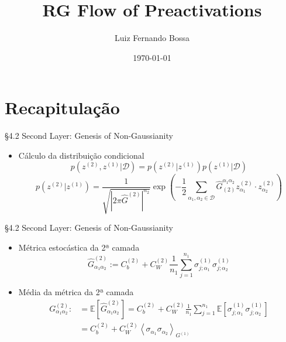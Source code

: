\documentclass{beamer}
\title{RG Flow of Preactivations}
\author{Luiz Fernando Bossa}
\date{\today}
\institute{Universidade Federal de Santa Catarina}
\newcommand{\EE}{\mathbb{E}}
\def\mi#1{{\alpha_{#1}}}
\def\Gchapp#1{\widehat{G}^{(#1)}}
\newcommand{\Gchapeu}[3]{{\Gchapp{#1}_{\mi{#2}\mi{#3}}}}
\newcommand{\Gchapeuinv}[3]{\widehat{G}_{(#1)}^{\mi{#2}\mi{#3}}}
\newcommand{\Gnormal}[3]{{G^{(#1)}_{\mi{#2}\mi{#3}}}}
\newcommand{\Expectation}[2]{\left\langle #1 \right\rangle_{#2}}
\begin{document}
{ 
\frame{\titlepage}}
\frame{\tableofcontents}


\section{Recapitulação}    
\begin{frame}
\tableofcontents[currentsection]
\end{frame}


\begin{frame}{\S 4.2 Second Layer: Genesis of Non-Gaussianity}
	\begin{itemize}
		\item Cálculo da distribuição condicional
		\begin{equation*}\tag{4.32}
			p\left(z^{(2)},z^{(1)}\Big|\mathcal{D}\right) = p\left(z^{(2)}\Big| z^{(1)}\right)p\left(z^{(1)}\Big| \mathcal{D}\right)
		\end{equation*}
		\begin{equation*}\tag{4.35}
			p\left(z^{(2)}\Big| z^{(1)}\right) = \frac{1}{\sqrt{\left|2\pi \hat{G}^{(2)}\right|^{n_2}}}
			\exp\left(-\frac{1}{2} \sum_{\mi1,\mi2\in\mathcal{D}} \Gchapeuinv212 z^{(2)}_{\mi1}\cdot z^{(2)}_{\mi2} \right)
		\end{equation*}
	\end{itemize}
\end{frame}

\begin{frame}{\S 4.2 Second Layer: Genesis of Non-Gaussianity}

\begin{itemize}
	\item 
	Métrica estocástica da 2ª camada
	\begin{equation*}\tag{4.36}
		\Gchapeu212 := C_b^{(2)} + C_W^{(2)}\frac{1}{n_1}\sum_{j=1}^{n_1} \sigma_{j;\mi1}^{(1)}\sigma_{j;\mi2}^{(1)}
	\end{equation*}

	\item Média da métrica da 2ª camada
	\begin{align*}
		\Gnormal212 :&= \EE\left[\Gchapeu212\right] 
		= C_b^{(2)} + C_W^{(2)}\frac{1}{n_1}\sum_{j=1}^{n_1} \EE\left[\sigma_{j;\mi1}^{(1)}\sigma_{j;\mi2}^{(1)}\right]\\
		&= C_b^{(2)} + C_W^{(2)}\Expectation{\sigma_{\mi1}\sigma_{\mi2}}{G^{(1)}}\tag{4.37}
	\end{align*}
\end{itemize}

\end{frame}
\end{document}

